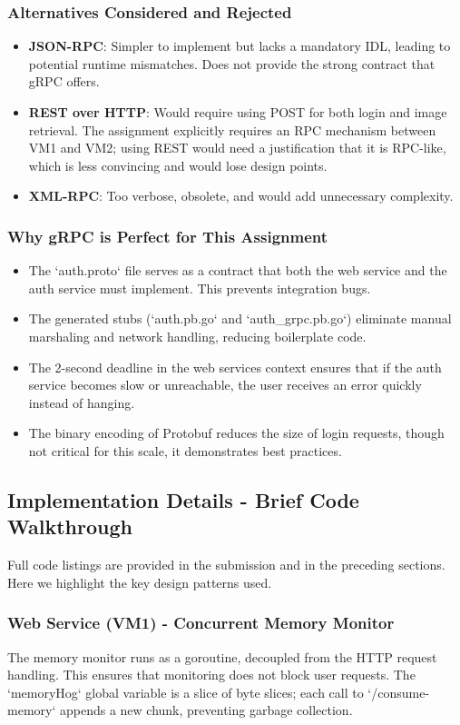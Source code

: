 \documentclass[a4paper]{article}
\begin{document}
\subsubsection{Alternatives Considered and Rejected}
\begin{itemize}
    \item \textbf{JSON-RPC}: Simpler to implement but lacks a mandatory IDL, leading to potential runtime mismatches. Does not provide the strong contract that gRPC offers.
    \item \textbf{REST over HTTP}: Would require using POST for both login and image retrieval. The assignment explicitly requires an RPC mechanism between VM1 and VM2; using REST would need a justification that it is RPC-like, which is less convincing and would lose design points.
    \item \textbf{XML-RPC}: Too verbose, obsolete, and would add unnecessary complexity.
\end{itemize}

\subsubsection{Why gRPC is Perfect for This Assignment}
\begin{itemize}
    \item The `auth.proto` file serves as a contract that both the web service and the auth service must implement. This prevents integration bugs.
    \item The generated stubs (`auth.pb.go` and `auth\_grpc.pb.go`) eliminate manual marshaling and network handling, reducing boilerplate code.
    \item The 2-second deadline in the web services context ensures that if the auth service becomes slow or unreachable, the user receives an error quickly instead of hanging.
    \item The binary encoding of Protobuf reduces the size of login requests, though not critical for this scale, it demonstrates best practices.
\end{itemize}

\subsection{Implementation Details - Brief Code Walkthrough}
Full code listings are provided in the submission and in the preceding sections. Here we highlight the key design patterns used.

\subsubsection{Web Service (VM1) - Concurrent Memory Monitor}
The memory monitor runs as a goroutine, decoupled from the HTTP request handling. This ensures that monitoring does not block user requests. The `memoryHog` global variable is a slice of byte slices; each call to `/consume-memory` appends a new chunk, preventing garbage collection.
\end{document}
